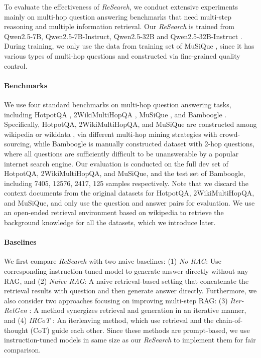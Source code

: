 \documentclass{article}
\begin{document}
To evaluate the effectiveness of \textit{ReSearch}, we conduct extensive experiments mainly on multi-hop question answering benchmarks that need multi-step reasoning and multiple information retrieval. 
Our \textit{ReSearch} is trained from Qwen2.5-7B, Qwen2.5-7B-Instruct, Qwen2.5-32B and Qwen2.5-32B-Instruct \cite{qwen25-tech-report}. During training, we only use the data from training set of MuSiQue \cite{musique}, since it has various types of multi-hop questions and constructed via fine-grained quality control.

\paragraph{Benchmarks} 
We use four standard benchmarks on multi-hop question answering tasks, including HotpotQA \cite{hotpotqa}, 2WikiMultiHopQA \cite{2wiki}, MuSiQue \cite{musique}, and Bamboogle \cite{selfask}.
Specifically, HotpotQA, 2WikiMultiHopQA, and MuSiQue are constructed among wikipedia or wikidata \cite{wikidata}, via different multi-hop mining strategies with crowd-sourcing, while Bamboogle is manually constructed dataset with 2-hop questions, where all questions are sufficiently difficult to be unanswerable by a popular internet search engine. 
Our evaluation is conducted on the full dev set of HotpotQA, 2WikiMultiHopQA, and MuSiQue, and the test set of Bamboogle, including 7405, 12576, 2417, 125 samples respectively.
Note that we discard the context documents from the original datasets for HotpotQA, 2WikiMultiHopQA, and MuSiQue, and only use the question and answer pairs for evaluation. 
We use an open-ended retrieval environment based on wikipedia to retrieve the background knowledge for all the datasets, which we introduce later.

\paragraph{Baselines}
We first compare \textit{ReSearch} with two naive baselines: (1) \textit{No RAG}: Use corresponding instruction-tuned model to generate answer directly without any RAG, and (2) \textit{Naive RAG}: A naive retrieval-based setting that concatenate the retrieval results with question and then generate answer directly.
Furthermore, we also consider two approaches focusing on improving multi-step RAG: (3) \textit{Iter-RetGen} \cite{iterretgen}: A method synergizes retrieval and generation in an iterative manner, and (4) \textit{IRCoT} \cite{ircot}: An iterleaving method, which use retrieval and the chain-of-thought (CoT) guide each other. Since these methods are prompt-based, we use instruction-tuned models in same size as our \textit{ReSearch} to implement them for fair comparison.
\end{document}
